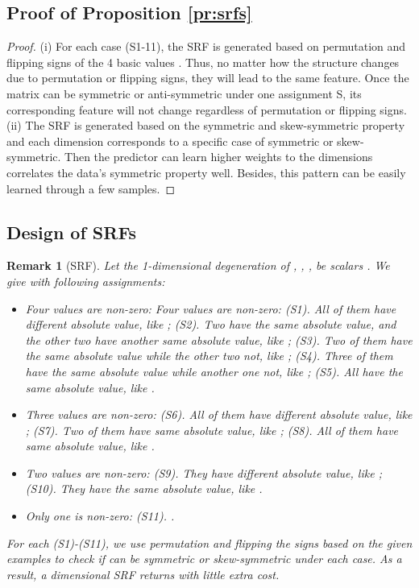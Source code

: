 \documentclass[conference]{IEEEtran}
\newtheorem{remark}{Remark}[section]
\begin{document}
\subsection{Proof of Proposition \ref{pr:srfs}}
\label{app:proof:srfs}
\begin{proof}
	(i) For each case (S1-11), the SRF is generated based on permutation and flipping signs of the 4 basic values .
	Thus, no matter how the structure  changes due to permutation or flipping signs,
	they will lead to the same feature.
	Once the matrix  can be symmetric or anti-symmetric under one assignment S,
	its corresponding feature will not change regardless of permutation or flipping signs.
	(ii) 
	The SRF is generated based on the symmetric and skew-symmetric property
	and each dimension corresponds to a specific case of symmetric or skew-symmetric.
	Then the predictor can learn higher weights to the dimensions correlates the data's symmetric property well.
	Besides, this pattern can be easily learned through  a few samples.
\end{proof}



\subsection{Design of SRFs}
\label{app:srf}

\begin{remark}[SRF] \label{def:SRFs}
Let the 1-dimensional degeneration of , , ,  be scalars .
We give  with following assignments:
	\begin{itemize}[leftmargin=10pt,topsep=0pt,parsep=0pt,partopsep=0pt]
	\item Four values are non-zero:
	Four values are non-zero: (S1). All of them have different absolute value, like ;
	(S2). Two have the same absolute value, and the other two have another same absolute value,	like ;
	(S3). Two of them have the same absolute value while the other two not, like ;
	(S4). Three of them have the same absolute value while another one not, like ; 
	(S5). All have the same absolute value, like .
	
	\item Three values are non-zero:
    (S6). All of them have different absolute value, like ;
    (S7). Two of them have same absolute value, like ;
    (S8). All of them have same absolute value, like .
    
    \item Two values are non-zero:
    (S9). They have different absolute value, like ;
    (S10). They have the same absolute value, like .
    
    \item Only one is non-zero: (S11). .
	\end{itemize}
	\noindent
	For each (S1)-(S11),
	we use permutation and flipping the signs based on the given examples to check if  can be symmetric or skew-symmetric under each case.
	As a result, a  dimensional SRF returns with little extra cost.
\end{remark}
\end{document}
